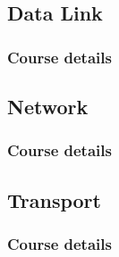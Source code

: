 \subsection{Data Link}
  \begin{frame}
    \frametitle{Course details}
  \end{frame}
\subsection{Network}
  \begin{frame}
    \frametitle{Course details}
  \end{frame}
\subsection{Transport}
  \begin{frame}
    \frametitle{Course details}
  \end{frame}
